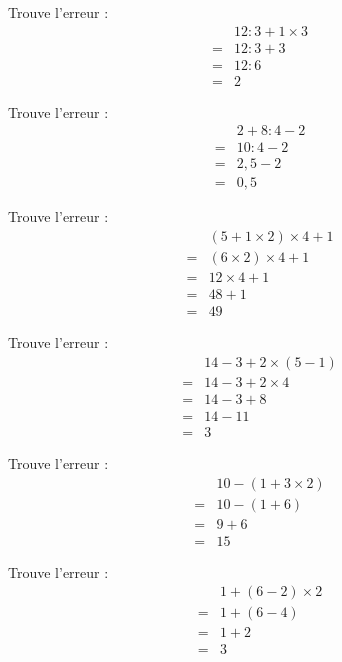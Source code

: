 \begin{multicols}{2}
    Trouve l'erreur :
    \begin{align*}
        &12:3+1\times 3\\
        =&12:3+3\\
        =&12:6\\
        =&2
    \end{align*}

    Trouve l'erreur :
    \begin{align*}
        &2+8:4-2\\
        =&10:4-2\\
        =&2,5-2\\
        =&0,5
    \end{align*}  
\end{multicols}

\begin{multicols}{2}
    Trouve l'erreur :
    \begin{align*}
        &(5+1\times 2)\times 4+1\\
        =&(6\times 2)\times 4+1\\
        =&12\times 4+1\\
        =&48+1\\
        =&49
    \end{align*}

    Trouve l'erreur :
    \begin{align*}
        &14-3+2\times (5-1)\\
        =&14-3+2\times 4\\
        =&14-3+8\\
        =&14-11\\
        =&3
    \end{align*}
\end{multicols}

\begin{multicols}{2}
    Trouve l'erreur :
    \begin{align*}
        &10-(1+3\times 2)\\
        =&10-(1+6)\\
        =&9+6\\
        =&15
    \end{align*}

    Trouve l'erreur :
    \begin{align*}
        &1+(6-2)\times 2\\
        =&1+(6-4)\\
        =&1+2\\
        =&3
    \end{align*}  
\end{multicols}

